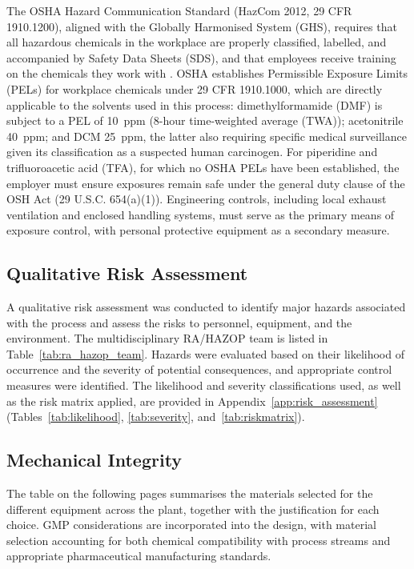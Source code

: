 The OSHA Hazard Communication Standard (HazCom 2012, 29 CFR 1910.1200), aligned with the Globally Harmonised System (GHS), requires that all hazardous chemicals in the workplace are properly classified, labelled, and accompanied by Safety Data Sheets (SDS), and that employees receive training on the chemicals they work with \cite{OSHA_HazCom}. OSHA establishes Permissible Exposure Limits (PELs) for workplace chemicals under 29 CFR 1910.1000, which are directly applicable to the solvents used in this process: dimethylformamide (DMF) is subject to a PEL of 10~ppm (8-hour time-weighted average (TWA)); acetonitrile 40~ppm; and DCM 25~ppm, the latter also requiring specific medical surveillance given its classification as a suspected human carcinogen. For piperidine and trifluoroacetic acid (TFA), for which no OSHA PELs have been established, the employer must ensure exposures remain safe under the general duty clause of the OSH Act (29 U.S.C. 654(a)(1)). Engineering controls, including local exhaust ventilation and enclosed handling systems, must serve as the primary means of exposure control, with personal protective equipment as a secondary measure.

\subsection{Qualitative Risk Assessment}

A qualitative risk assessment was conducted to identify major hazards associated with the process and assess the risks to personnel, equipment, and the environment. The multidisciplinary RA/HAZOP team is listed in Table~\ref{tab:ra_hazop_team}. Hazards were evaluated based on their likelihood of occurrence and the severity of potential consequences, and appropriate control measures were identified. The likelihood and severity classifications used, as well as the risk matrix applied, are provided in Appendix~\ref{app:risk_assessment} (Tables~\ref{tab:likelihood}, \ref{tab:severity}, and~\ref{tab:riskmatrix}).



\subsection{Mechanical Integrity}

The table on the following pages summarises the materials selected for the different equipment across the plant, together with the justification for each choice. GMP considerations are incorporated into the design, with material selection accounting for both chemical compatibility with process streams and appropriate pharmaceutical manufacturing standards.

